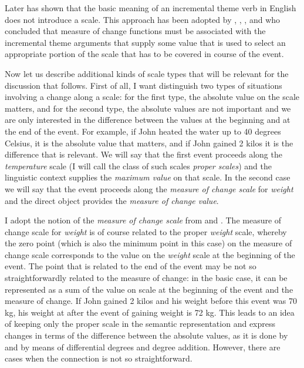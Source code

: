 Later \citet{Filip:05} has shown that the basic meaning of an incremental theme verb in English does not introduce a scale. This approach has been adopted by \citet{Rappaport:08}, \citet{LevinRappaport:10}, \citet{Kennedy:12}, and \citet{Bochnak:13} who concluded that measure of change functions must be associated with the incremental theme arguments that supply some value that is used to select an appropriate portion of the scale that has to be covered in course of the event. 

Now let us describe additional kinds of scale types that will be relevant for the discussion that follows. First of all, I want distinguish two types of situations involving a change along a scale: for the first type, the absolute value on the scale matters, and for the second type, the absolute values are not important and we are only interested in the difference between the values at the beginning and at the end of the event. For example, if John heated the water up to 40 degrees Celsius, it is the absolute value that matters, and if John gained 2 kilos it is the difference that is relevant. We will say that the first event proceeds along the \textit{temperature} scale (I will call the class of such scales \textit{proper scales}) and the linguistic context supplies the \textit{maximum value} on that scale. In the second case we will say that the event proceeds along the \textit{measure of change scale} for \textit{weight} and the direct object provides the \textit{measure of change value}. 

I adopt the notion of the \textit{measure of change scale} from \citet{KennedyLevin:08} and \citet{Kennedy:12}. The measure of change scale for \textit{weight} is of course related to the proper \textit{weight} scale, whereby the zero point (which is also the minimum point in this case) on the measure of change scale corresponds to the value on the \textit{weight} scale at the beginning of the event. The point that is related to the end of the event may be not so straightforwardly related to the measure of change: in the basic case, it can be represented as a sum of the value on scale at the beginning of the event and the measure of change. If John gained 2 kilos and his weight before this event was 70 kg, his weight at after the event of gaining weight is 72 kg. This leads to an idea of keeping only the proper scale in the semantic representation and express changes in terms of the difference between the absolute values, as it is done by \citealt{Kennedy:01} and \citealt{KennedyLevin:02} by means of differential degrees and degree addition. However, there are cases when the connection is not so straightforward.

